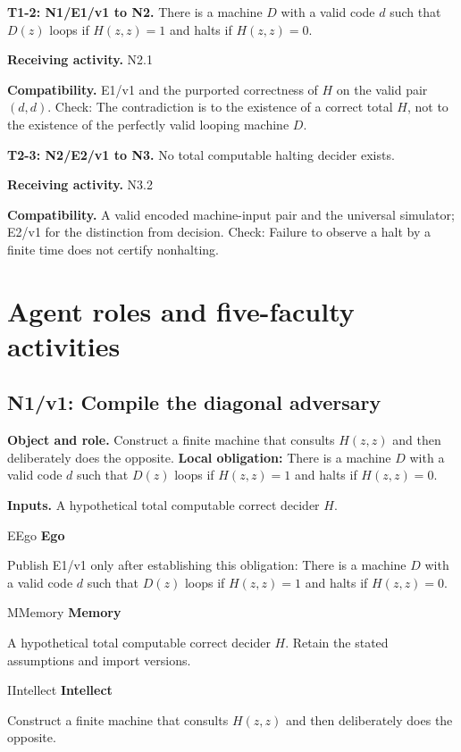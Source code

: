 \documentclass[preprint,12pt,aps,pra,showkeys,amsmath,amssymb,superscriptaddress,floatfix]{revtex4-2}
\theoremstyle{definition}
\theoremstyle{remark}
\newcommand{\mmfaculty}[3]{%
 \begin{mmfacultybox}{#1}{#2}
 {\sffamily\bfseries\color{MMBlue}#2}\par\smallskip #3
 \end{mmfacultybox}}
\newcommand{\field}[2]{\par\smallskip\noindent\textbf{#1.} #2\par}
\begin{document}
\begingroup\small\linespread{1.05}\selectfont

\field{T1-2: N1/E1/v1 to N2}{There is a machine \(D\) with a valid code \(d\) such that \(D(z)\)
loops if \(H(z,z)=1\) and halts if \(H(z,z)=0\).}

\field{Receiving activity}{N2.1}

\field{Compatibility}{E1/v1 and the purported correctness of \(H\) on the valid pair
\((d,d)\). Check: The contradiction is to the existence of a correct
total \(H\), not to the existence of the perfectly valid looping machine
\(D\).}

\field{T2-3: N2/E2/v1 to N3}{No total computable halting decider exists.}

\field{Receiving activity}{N3.2}

\field{Compatibility}{A valid encoded machine-input pair and the universal simulator; E2/v1
for the distinction from decision. Check: Failure to observe a halt by a
finite time does not certify nonhalting.}

\endgroup

\clearpage\section{Agent roles and five-faculty activities}\begingroup\small\linespread{1.05}\selectfont{}

\subsection{N1/v1: Compile the diagonal adversary}

\field{Object and role}{Construct a finite machine that consults \(H(z,z)\) and then
deliberately does the opposite. \textbf{Local obligation:} There is a
machine \(D\) with a valid code \(d\) such that \(D(z)\) loops if
\(H(z,z)=1\) and halts if \(H(z,z)=0\).}

\field{Inputs}{A hypothetical total computable correct decider \(H\).}

\mmfaculty{E}{Ego}{Publish E1/v1 only after establishing this obligation: There is a
machine \(D\) with a valid code \(d\) such that \(D(z)\) loops if
\(H(z,z)=1\) and halts if \(H(z,z)=0\).}

\mmfaculty{M}{Memory}{A hypothetical total computable correct decider \(H\). Retain the stated
assumptions and import versions.}

\mmfaculty{I}{Intellect}{Construct a finite machine that consults \(H(z,z)\) and then
deliberately does the opposite.}
\end{document}
